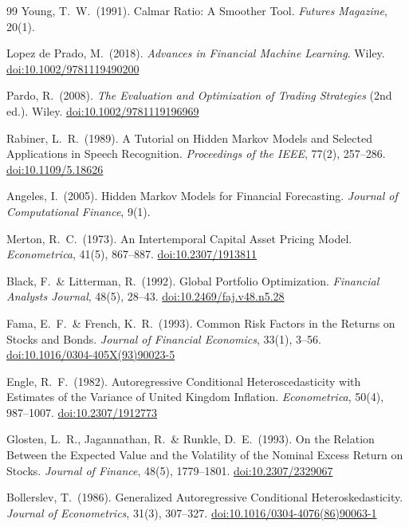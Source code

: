 \documentclass[12pt,openany]{book}
\numberwithin{equation}{chapter}
\theoremstyle{plain}
\theoremstyle{definition}
\theoremstyle{remark}
\numberwithin{equation}{chapter}
\theoremstyle{plain}
\begin{document}
\begin{thebibliography}{99}
Young, T.\ W.\ (1991).
Calmar Ratio: A Smoother Tool.
\textit{Futures Magazine}, 20(1).

Lopez de Prado, M.\ (2018).
\textit{Advances in Financial Machine Learning}.
Wiley.
\href{https://doi.org/10.1002/9781119490200}{doi:10.1002/9781119490200}

Pardo, R.\ (2008).
\textit{The Evaluation and Optimization of Trading Strategies}
(2nd ed.). Wiley.
\href{https://doi.org/10.1002/9781119196969}{doi:10.1002/9781119196969}

Rabiner, L.\ R.\ (1989).
A Tutorial on Hidden Markov Models and Selected Applications
in Speech Recognition.
\textit{Proceedings of the IEEE}, 77(2), 257--286.
\href{https://doi.org/10.1109/5.18626}{doi:10.1109/5.18626}

Angeles, I.\ (2005).
Hidden Markov Models for Financial Forecasting.
\textit{Journal of Computational Finance}, 9(1).

Merton, R.\ C.\ (1973).
An Intertemporal Capital Asset Pricing Model.
\textit{Econometrica}, 41(5), 867--887.
\href{https://doi.org/10.2307/1913811}{doi:10.2307/1913811}

Black, F.\ \& Litterman, R.\ (1992).
Global Portfolio Optimization.
\textit{Financial Analysts Journal}, 48(5), 28--43.
\href{https://doi.org/10.2469/faj.v48.n5.28}{doi:10.2469/faj.v48.n5.28}

Fama, E.\ F.\ \& French, K.\ R.\ (1993).
Common Risk Factors in the Returns on Stocks and Bonds.
\textit{Journal of Financial Economics}, 33(1), 3--56.
\href{https://doi.org/10.1016/0304-405X(93)90023-5}{doi:10.1016/0304-405X(93)90023-5}

Engle, R.\ F.\ (1982).
Autoregressive Conditional Heteroscedasticity with Estimates of
the Variance of United Kingdom Inflation.
\textit{Econometrica}, 50(4), 987--1007.
\href{https://doi.org/10.2307/1912773}{doi:10.2307/1912773}

Glosten, L.\ R., Jagannathan, R.\ \& Runkle, D.\ E.\ (1993).
On the Relation Between the Expected Value and the Volatility of
the Nominal Excess Return on Stocks.
\textit{Journal of Finance}, 48(5), 1779--1801.
\href{https://doi.org/10.2307/2329067}{doi:10.2307/2329067}

Bollerslev, T.\ (1986).
Generalized Autoregressive Conditional Heteroskedasticity.
\textit{Journal of Econometrics}, 31(3), 307--327.
\href{https://doi.org/10.1016/0304-4076(86)90063-1}{doi:10.1016/0304-4076(86)90063-1}


\end{thebibliography}
\end{document}
